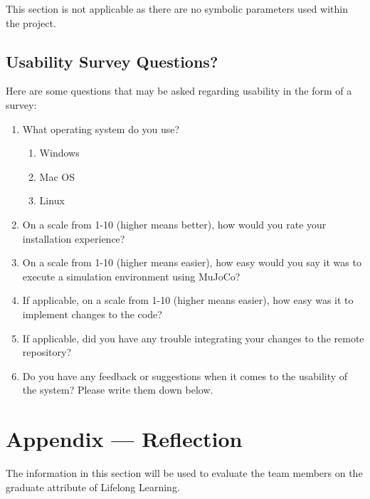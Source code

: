 \documentclass[12pt, titlepage]{article}
\begin{document}

This section is not applicable as there are no symbolic parameters used within the project.


\subsection{Usability Survey Questions?}


Here are some questions that may be asked regarding usability in the form of a survey:
\begin{enumerate}
  \item What operating system do you use?
  \begin{enumerate}
    \item Windows
    \item Mac OS
    \item Linux
  \end{enumerate}
  \item On a scale from 1-10 (higher means better), how would you rate your installation experience?
  \item On a scale from 1-10 (higher means easier), how easy would you say it was to execute a simulation environment using MuJoCo?
  \item If applicable, on a scale from 1-10 (higher means easier), how easy was it to implement changes to the code?
  \item If applicable, did you have any trouble integrating your changes to the remote repository?
  \item Do you have any feedback or suggestions when it comes to the usability of the system? Please write them down below.
\end{enumerate}

\newpage{}
\section*{Appendix --- Reflection}


The information in this section will be used to evaluate the team members on the
graduate attribute of Lifelong Learning.


\end{document}
